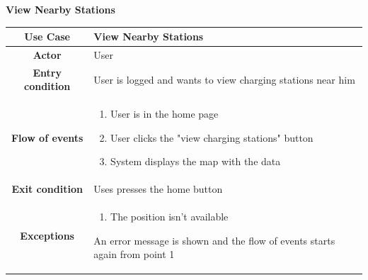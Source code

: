 \documentclass[table, 12pt]{article} %
\begin{document}
\begin{itemize}
            \begin{table}[H]
                \item[] \textbf{View Nearby Stations}
                \item[]
                \centering
                \begin{tabular}{|c |m{}|}
                    \hline
                    \textbf{Use Case} & View Nearby Stations\\ \hline
                    \textbf{Actor} & User\\ \hline
                    \textbf{Entry condition} & User is logged and wants to view charging stations near him\\  \hline
                    \textbf{Flow of events} & \begin{enumerate}
                                                \item User is in the home page
                                                \item User clicks the "view charging stations" button
                                                \item System displays the map with the data
                                            \end{enumerate}\\ \hline
                    \textbf{Exit condition} & Uses presses the home button  \\ \hline
                    \textbf{Exceptions} &  \begin{enumerate}
                        \item The position isn't available
                    \end{enumerate}
                    An error message is shown and the flow of events starts again from point 1\\ \hline
                \end{tabular}
            \end{table}



\end{itemize}
\end{document}
